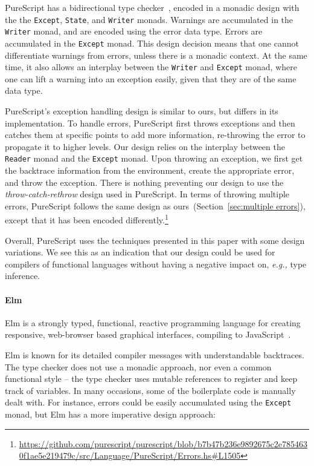 \documentclass[sigplan,screen]{acmart}
\makeatletter
\newcommand{\ec}[1]{\lstinline[style=encore,breaklines=true,basicstyle=\fontsize{9}{9}\tt]@#1@}
\newcommand{\astt}[0]{\textit{AST}}
\makeatother
\begin{document}
PureScript has a bidirectional type checker~\cite{bidirectionaltypechecking},
encoded in a monadic design with the
the \texttt{Except}, \texttt{State}, and \texttt{Writer} monads.
%
Warnings are accumulated in the \ec{Writer} monad, and are encoded using the error data type.
Errors are accumulated in the \ec{Except} monad. This design decision means that one cannot differentiate
warnings from errors, unless there is a monadic context. At the same time, it also allows an
interplay between the \ec{Writer} and \ec{Except} monad, where one can lift
a warning into an exception easily, given that they are of the same data type.

PureScript's exception handling design is similar to ours, but differs in its implementation.
To handle errors, PureScript first throws exceptions and
then catches them at specific points to
add more information, re-throwing the error to propagate it to higher levels.
Our design relies on the interplay between the \ec{Reader} monad
and the \ec{Except} monad. Upon throwing an exception, we first get the backtrace information
from the environment, create the appropriate error, and throw the exception.
There is nothing preventing
our design to use the \emph{throw-catch-rethrow} design used in PureScript.
%
In terms of throwing multiple errors, PureScript follows the same design
as ours~(Section~\ref{sec:multiple errors}),
except that it has been encoded differently.\footnote{\url{https://github.com/purescript/purescript/blob/b7b47b236e9892675c2e7854630f1ae5e219479c/src/Language/PureScript/Errors.hs\#L1505}}

Overall, PureScript uses the techniques presented in this paper with some design variations.
We see this as an indication that our design
could be used for compilers of functional languages without having a negative impact on, \emph{e.g.,} type inference.

\paragraph{Elm}
Elm is a strongly typed, functional, reactive programming language for creating responsive, web-browser
based graphical interfaces, compiling to JavaScript~\cite{Elm}.

Elm is known for its detailed compiler messages with understandable backtraces.
The type checker does not use a monadic approach, nor even a common
functional style -- the type checker uses mutable references to register and keep track of variables. In many occasions,
some of the boilerplate code is manually dealt with. For instance, errors
could be easily accumulated using the \texttt{Except} monad, but Elm has a
more imperative design approach:
\end{document}
